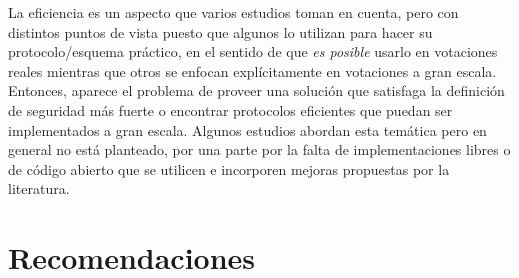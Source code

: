 La eficiencia es un aspecto que varios estudios toman en cuenta, pero con 
distintos puntos de vista puesto que algunos lo utilizan para hacer su protocolo/esquema
práctico, en el sentido de que \textit{es posible} usarlo en votaciones reales
mientras que otros se enfocan explícitamente en votaciones a gran escala. Entonces, aparece 
el problema de proveer una solución que satisfaga la
definición de seguridad más fuerte o encontrar protocolos eficientes que puedan
ser implementados a gran escala. Algunos estudios abordan esta temática
pero en general no está planteado, por una parte por la falta de implementaciones
libres o de código abierto que se utilicen e incorporen mejoras propuestas
por la literatura.


\newpage
\section{Recomendaciones}

